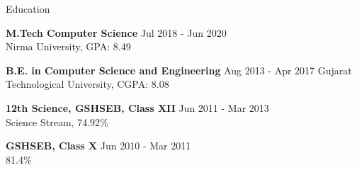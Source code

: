 \documentclass{resume} %
\begin{document}



\begin{rSection}{Education}

{\bf M.Tech Computer Science} \hfill {Jul 2018 - Jun 2020 }
\\ 
Nirma University, GPA: 8.49

{\bf B.E. in Computer Science and Engineering} \hfill {Aug 2013 - Apr 2017 }
Gujarat Technological University, CGPA: 8.08

{\textbf{12th Science, GSHSEB, Class XII}}  \hfill {Jun 2011 - Mar 2013 }\\
Science Stream, 74.92\% 
 
{\textbf{GSHSEB, Class X}}  \hfill {Jun 2010 - Mar 2011 }\\
81.4\%


\end{rSection}
\end{document}
